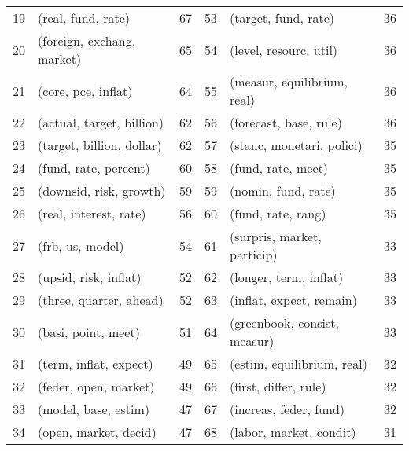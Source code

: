 \begin{tabular}{rlrrlr}
 19 &          (real, fund, rate) &     67 &  53 &          (target, fund, rate) &     36 \\
 20 &  (foreign, exchang, market) &     65 &  54 &        (level, resourc, util) &     36 \\
 21 &         (core, pce, inflat) &     64 &  55 &   (measur, equilibrium, real) &     36 \\
 22 &   (actual, target, billion) &     62 &  56 &        (forecast, base, rule) &     36 \\
 23 &   (target, billion, dollar) &     62 &  57 &     (stanc, monetari, polici) &     35 \\
 24 &       (fund, rate, percent) &     60 &  58 &            (fund, rate, meet) &     35 \\
 25 &     (downsid, risk, growth) &     59 &  59 &           (nomin, fund, rate) &     35 \\
 26 &      (real, interest, rate) &     56 &  60 &            (fund, rate, rang) &     35 \\
 27 &            (frb, us, model) &     54 &  61 &   (surpris, market, particip) &     33 \\
 28 &       (upsid, risk, inflat) &     52 &  62 &        (longer, term, inflat) &     33 \\
 29 &     (three, quarter, ahead) &     52 &  63 &      (inflat, expect, remain) &     33 \\
 30 &         (basi, point, meet) &     51 &  64 &  (greenbook, consist, measur) &     33 \\
 31 &      (term, inflat, expect) &     49 &  65 &    (estim, equilibrium, real) &     32 \\
 32 &       (feder, open, market) &     49 &  66 &         (first, differ, rule) &     32 \\
 33 &        (model, base, estim) &     47 &  67 &        (increas, feder, fund) &     32 \\
 34 &       (open, market, decid) &     47 &  68 &       (labor, market, condit) &     31 \\
\bottomrule
\end{tabular}

